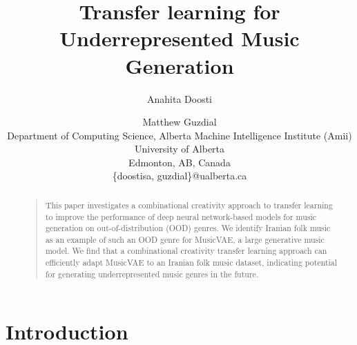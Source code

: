 \documentclass[letterpaper]{article}
\title{Transfer learning for Underrepresented Music Generation}
\author{Anahita Doosti \and Matthew Guzdial\\
Department of Computing Science, Alberta Machine Intelligence Institute (Amii)\\
University of Alberta\\
Edmonton, AB, Canada\\
\{doostisa, guzdial\}@ualberta.ca\\
}
\begin{document}
 
\maketitle
\begin{abstract}
\begin{quote}
This paper investigates a combinational creativity approach to transfer learning to improve the performance of deep neural network-based models for music generation on out-of-distribution (OOD) genres. We identify Iranian folk music as an example of such an OOD genre for MusicVAE, a large generative music model. We find that a combinational creativity transfer learning approach can efficiently adapt MusicVAE to an Iranian folk music dataset, indicating potential for generating underrepresented music genres in the future.
\end{quote}
\end{abstract}

\section{Introduction}
\end{document}
